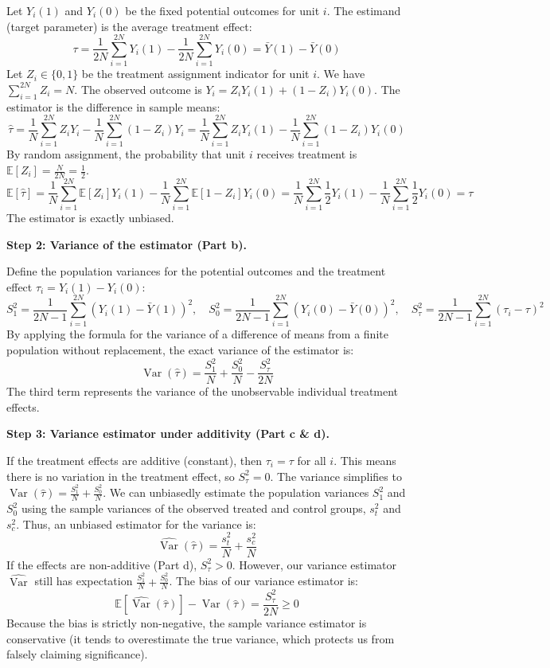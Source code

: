 \begin{solution}
Let $Y_i(1)$ and $Y_i(0)$ be the fixed potential outcomes for unit $i$.
The estimand (target parameter) is the average treatment effect:
\[ \tau = \frac{1}{2N} \sum_{i=1}^{2N} Y_i(1) - \frac{1}{2N} \sum_{i=1}^{2N} Y_i(0) = \bar{Y}(1) - \bar{Y}(0) \]
Let $Z_i \in \{0, 1\}$ be the treatment assignment indicator for unit $i$. We have $\sum_{i=1}^{2N} Z_i = N$.
The observed outcome is $Y_i = Z_i Y_i(1) + (1-Z_i) Y_i(0)$.
The estimator is the difference in sample means:
\[ \hat{\tau} = \frac{1}{N} \sum_{i=1}^{2N} Z_i Y_i - \frac{1}{N} \sum_{i=1}^{2N} (1-Z_i) Y_i = \frac{1}{N} \sum_{i=1}^{2N} Z_i Y_i(1) - \frac{1}{N} \sum_{i=1}^{2N} (1-Z_i) Y_i(0) \]
By random assignment, the probability that unit $i$ receives treatment is $\mathbb{E}[Z_i] = \frac{N}{2N} = \frac{1}{2}$.
\[ \mathbb{E}[\hat{\tau}] = \frac{1}{N} \sum_{i=1}^{2N} \mathbb{E}[Z_i] Y_i(1) - \frac{1}{N} \sum_{i=1}^{2N} \mathbb{E}[1-Z_i] Y_i(0) = \frac{1}{N} \sum_{i=1}^{2N} \frac{1}{2} Y_i(1) - \frac{1}{N} \sum_{i=1}^{2N} \frac{1}{2} Y_i(0) = \tau \]
The estimator is exactly unbiased.

\textbf{Step 2: Variance of the estimator (Part b).}

Define the population variances for the potential outcomes and the treatment effect $\tau_i = Y_i(1) - Y_i(0)$:
\[ S_1^2 = \frac{1}{2N-1} \sum_{i=1}^{2N} (Y_i(1) - \bar{Y}(1))^2, \quad S_0^2 = \frac{1}{2N-1} \sum_{i=1}^{2N} (Y_i(0) - \bar{Y}(0))^2, \quad S_\tau^2 = \frac{1}{2N-1} \sum_{i=1}^{2N} (\tau_i - \tau)^2 \]
By applying the formula for the variance of a difference of means from a finite population without replacement, the exact variance of the estimator is:
\[ \operatorname{Var}(\hat{\tau}) = \frac{S_1^2}{N} + \frac{S_0^2}{N} - \frac{S_\tau^2}{2N} \]
The third term represents the variance of the unobservable individual treatment effects.

\textbf{Step 3: Variance estimator under additivity (Part c \& d).}

If the treatment effects are additive (constant), then $\tau_i = \tau$ for all $i$. This means there is no variation in the treatment effect, so $S_\tau^2 = 0$.
The variance simplifies to $\operatorname{Var}(\hat{\tau}) = \frac{S_1^2}{N} + \frac{S_0^2}{N}$.
We can unbiasedly estimate the population variances $S_1^2$ and $S_0^2$ using the sample variances of the observed treated and control groups, $s_t^2$ and $s_c^2$.
Thus, an unbiased estimator for the variance is:
\[ \widehat{\operatorname{Var}}(\hat{\tau}) = \frac{s_t^2}{N} + \frac{s_c^2}{N} \]
If the effects are non-additive (Part d), $S_\tau^2 > 0$. However, our variance estimator $\widehat{\operatorname{Var}}$ still has expectation $\frac{S_1^2}{N} + \frac{S_0^2}{N}$.
The bias of our variance estimator is:
\[ \mathbb{E}[\widehat{\operatorname{Var}}(\hat{\tau})] - \operatorname{Var}(\hat{\tau}) = \frac{S_\tau^2}{2N} \geq 0 \]
Because the bias is strictly non-negative, the sample variance estimator is conservative (it tends to overestimate the true variance, which protects us from falsely claiming significance).


\end{solution}
